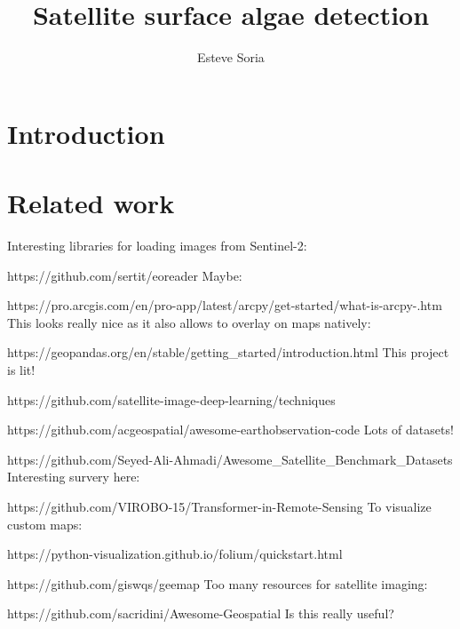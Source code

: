 \documentclass[notitlepage]{report}
\title{Satellite surface algae detection}
\author{Esteve Soria}
\begin{document}
    \maketitle
    \thispagestyle{empty}

    \begin{abstract}
        \lipsum[1]
    \end{abstract}


    \section*{Introduction}


    \section*{Related work}
    Interesting libraries for loading images from Sentinel-2:

    https://github.com/sertit/eoreader
    \newline
    Maybe:

    https://pro.arcgis.com/en/pro-app/latest/arcpy/get-started/what-is-arcpy-.htm
    \newline
    This looks really nice as it also allows to overlay on maps natively:

    https://geopandas.org/en/stable/getting\_started/introduction.html
    \newline
    This project is lit!

    https://github.com/satellite-image-deep-learning/techniques

    https://github.com/acgeospatial/awesome-earthobservation-code
    \newline
    Lots of datasets!

    https://github.com/Seyed-Ali-Ahmadi/Awesome\_Satellite\_Benchmark\_Datasets
    \newline
    Interesting survery here:

    https://github.com/VIROBO-15/Transformer-in-Remote-Sensing
    \newline
    To visualize custom maps:

    https://python-visualization.github.io/folium/quickstart.html

    https://github.com/giswqs/geemap
    \newline
    Too many resources for satellite imaging:

    https://github.com/sacridini/Awesome-Geospatial
    \newline
    Is this really useful?
\end{document}
